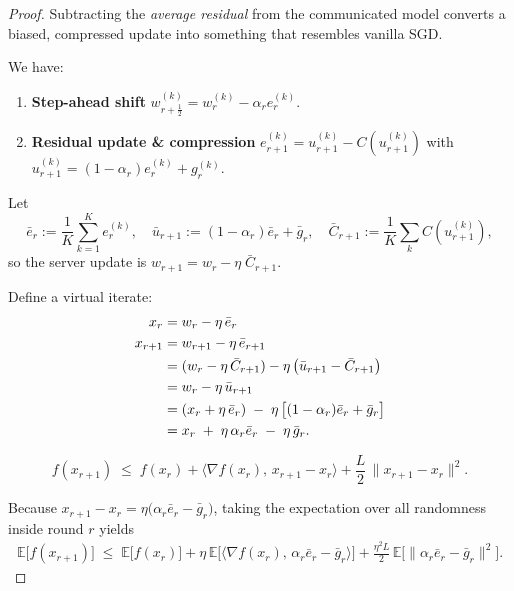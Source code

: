 \documentclass{article} %
\begin{document}
\begin{proof}
Subtracting the \emph{average residual} from the communicated model converts a biased, compressed update into something that resembles vanilla SGD.  

We have:
\begin{enumerate}
  \item \textbf{Step-ahead shift} $w_{r+\frac12}^{(k)}\!=w_r^{(k)}-\alpha_r e_r^{(k)}$.
  \item \textbf{Residual update \& compression} $e_{r+1}^{(k)}=u_{r+1}^{(k)}-C(u_{r+1}^{(k)})$ with\\
  $u_{r+1}^{(k)}=(1-\alpha_r)e_r^{(k)}+g_r^{(k)}$.
\end{enumerate}

Let
\[
\bar e_r:=\frac1K\sum_{k=1}^Ke_r^{(k)},\quad
\bar u_{r+1}:=(1-\alpha_r)\bar e_r+\bar g_r,\quad
\bar C_{r+1}:=\frac1K\sum_{k}C(u_{r+1}^{(k)}) ,
\]
so the server update is $w_{r+1}=w_r-\eta\;\bar C_{r+1}$.

Define a virtual iterate:
\[
\begin{aligned}
x_r
  &= w_r-\eta\,\bar e_r \\
x_{r+1}
  &= w_{r+1}-\eta\,\bar e_{r+1}                                                   \notag\\
  &= (w_r-\eta\,\bar C_{r+1})-\eta\,\bigl(\bar u_{r+1}-\bar C_{r+1}\bigr)               \\
  &= w_r-\eta\,\bar u_{r+1}                                                       \\
  &= (x_r+\eta\,\bar e_r)\;-\;\eta\,\bigl[(1-\alpha_r)\bar e_r+\bar g_r\bigr]           \\
  &= x_r\;+\;\eta\,\alpha_r\bar e_r\;-\;\eta\,\bar g_r. 
\end{aligned} 
\]

\begin{equation}\label{eq:descent_raw}
   f(x_{r+1}) \;\le\; f(x_r)
      + \bigl\langle \nabla f(x_r),\,x_{r+1}-x_r \bigr\rangle
      + \frac{L}{2}\,\bigl\|x_{r+1}-x_r\bigr\|^{2}.
\end{equation}

Because \(x_{r+1}-x_r = \eta\bigl(\alpha_r\bar e_r-\bar g_r\bigr)\), taking the
expectation over all randomness inside round \(r\) yields
\begin{align}\label{eq:descent_exp}
   \mathbb{E}\!\bigl[f(x_{r+1})\bigr]
   \;\le\;
   \mathbb{E}\!\bigl[f(x_r)\bigr]
   + \eta\,\mathbb{E}\!\bigl[
       \bigl\langle\nabla f(x_r),\,\alpha_r\bar e_r-\bar g_r\bigr\rangle
     \bigr]
   + \frac{\eta^{2}L}{2}\,
     \mathbb{E}\!\bigl[
       \bigl\|\alpha_r\bar e_r-\bar g_r\bigr\|^{2}
     \bigr].
\end{align}


\end{proof}
\end{document}
